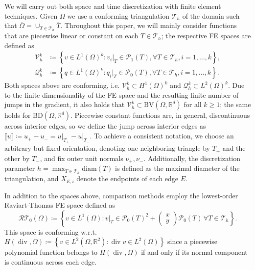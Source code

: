 \documentclass{article}
\DeclareMathOperator{\Div}{div}
\newcommand{\R}{\mathbb{R}}
\newcommand{\BV}{\mathrm{BV}}
\newcommand{\BD}{\mathrm{BD}}
\begin{document}
	We will carry out both space and time discretization with finite element techniques.
	Given $\Omega$ we use a conforming triangulation $\mathcal{T}_h$ of the domain such that $\overline{\Omega} = \cup_{T\in\mathcal{T}_h}\overline{T}$.
	Throughout this paper, we will mainly consider functions that are piecewise linear or constant on each $T\in\mathcal{T}_h$; the respective FE spaces are defined as
	\begin{align}
		\mathcal{V}_h^k &\coloneqq \left\lbrace v\in L^1(\Omega)^k \colon v_i\lvert_{T}\in \mathcal{P}_1(T), \forall T \in \mathcal{T}_h, i=1, \ldots, k \right\rbrace\label{eq:pw_linFEspace},\\
		\mathcal{Q}_h^k &\coloneqq \left\lbrace q\in L^1(\Omega)^k \colon q_i\lvert_{T}\in \mathcal{P}_0(T), \forall T \in \mathcal{T}_h, i=1,\ldots, k \right\rbrace\label{eq:pw_constFEspace}.
	\end{align}
	Both spaces above are conforming, i.e. $ \mathcal{V}_h^k \subset H^1(\Omega)^k$ and $\mathcal{Q}_h^k\subset L^2(\Omega)^k$.
	Due to the finite dimensionality of the FE space and the resulting finite number of jumps in the gradient, it also holds that $\mathcal{V}_h^k\subset\BV(\Omega, \R^d)$ for all $k\geq 1$; the same holds for $\BD(\Omega, \R^d)$.
	Piecewise constant functions are, in general, discontinuous across interior edges, so we define the jump across interior edges as $\llbracket u \rrbracket \coloneqq u_+ - u_- = u\rvert_{T_+} - u\rvert_{T_-}$.
	To achieve a consistent notation, we choose an arbitrary but fixed orientation, denoting one neighboring triangle by $T_+$ and the other by $T_-$, and fix outer unit normals $\nu_+, \nu_-$.
	Additionally, the discretization parameter $h = \max_{T\in \mathcal{T}_h}\mathrm{diam}(T)$ is defined as the maximal diameter of the triangulation, and $X_{E,i}$ denote the endpoints of each edge $E$.
	
	In addition to the spaces above, comparison methods employ the lowest-order Raviart-Thomas FE space defined as
	\begin{equation*}
		\mathcal{RT}_0(\Omega) \coloneqq \left\lbrace v\in L^1(\Omega) \colon v\rvert_T \in \mathcal{P}_0(T)^2 + \begin{pmatrix}
			x\\y
		\end{pmatrix}\mathcal{P}_0(T) \, \forall T\in \mathcal{T}_h\right\rbrace.
	\end{equation*}
	This space is conforming w.r.t.~$H(\Div,\Omega) \coloneqq \left\lbrace v \in L^2(\Omega, \R^2) \colon \Div v \in L^2(\Omega)\right\rbrace$ since a piecewise polynomial function belongs to $H(\Div,\Omega)$ if and only if its normal component is continuous across each edge.
	
\end{document}
